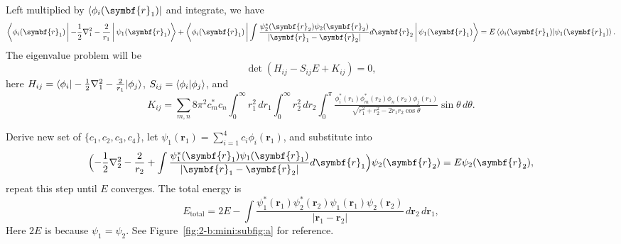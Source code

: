 \documentclass[12pt]{article}
\begin{document}
Left multiplied by $\bra{\phi_i(\symbf{r}_1)}$ and integrate, we have
%
\begin{equation}
    \begin{aligned}
        \Braket{\phi_i(\symbf{r}_1) | - \frac{1}{2}\nabla_1^2 - \frac{2}{r_1} | \psi_1(\symbf{r}_1)} +
        \Braket{\phi_i(\symbf{r}_1) |
            \int \frac{\psi_2^\ast(\symbf{r}_2)\psi_2(\symbf{r}_2)}{\lvert \symbf{r}_1 - \symbf{r}_2 \rvert} d\symbf{r}_2 |
            \psi_1(\symbf{r}_1)}
        = E \braket{\phi_i(\symbf{r}_1) | \psi_1(\symbf{r}_1)}.
    \end{aligned}
\end{equation}
%
The eigenvalue problem will be
%
\begin{equation}
    \det (H_{ij} - S_{ij} E + K_{ij}) = 0,
\end{equation}
%
here $H_{ij} = \braket{\phi_i | - \frac{1}{2}\nabla_1^2 - \frac{2}{r_1} | \phi_j}$,
$S_{ij} = \braket{\phi_i | \phi_j}$, and
%
\begin{equation}
    K_{ij} = \sum_{m, n} 8\pi^2 c_m^\ast c_n
    \int_{0}^{\infty} r_1^2  \, dr_1
    \int_{0}^{\infty} r_2^2 \, dr_2 \int_{0}^{\pi}
    \tfrac{\phi_i^\ast(r_1) \phi_m^\ast(r_2) \phi_n(r_2)\phi_j(r_1)}{\sqrt{r_1^2 + r_2^2 - 2 r_1 r_2 \cos\theta}}
    \sin\theta\, d\theta.
\end{equation}

Derive new set of $\{c_1, c_2, c_3, c_4\}$,
let $\psi_1(\symbf{r}_1) = \sum_{i=1}^{4} c_i \phi_i(\symbf{r}_1)$, and substitute into
%
\begin{equation}
    \Bigl(
    -\frac{1}{2}\nabla_2^2 - \frac{2}{r_2} +
    \int \frac{\psi_1^\ast(\symbf{r}_1)\psi_1(\symbf{r}_1)}{\lvert \symbf{r}_1 - \symbf{r}_2 \rvert} d\symbf{r}_1
    \Bigr)
    \psi_2(\symbf{r}_2) = E \psi_2 (\symbf{r}_2),
\end{equation}
%
repeat this step until $E$ converges. The total energy is
%
\begin{equation}
    E_{\text{total}} = 2E -
    \int \frac{\psi_1^\ast(\symbf{r}_1)\psi_2^\ast(\symbf{r}_2) \psi_1(\symbf{r}_1)
        \psi_2(\symbf{r}_2)}{\lvert \symbf{r}_1 - \symbf{r}_2 \rvert}
    \, d\symbf{r}_2 \, d\symbf{r}_1,
\end{equation}
%
Here $2E$ is because $\psi_1 = \psi_2$. See Figure~\ref{fig:2-b:mini:subfig:a} for reference.
\end{document}
